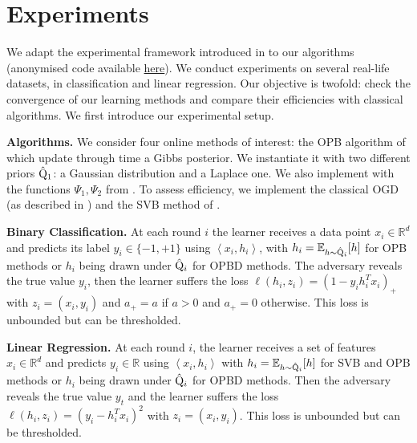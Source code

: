 \section{Experiments}
\label{sec: experiments}

We adapt the experimental framework introduced in \citet[Sec.5]{cherief2019generalization} to our algorithms (anonymised code available \href{https://anonymous.4open.science/r/Online-PAC-Bayes-learning-044F}{here}). We conduct experiments on several real-life datasets, in classification and
linear regression. Our objective is twofold: check the convergence of our learning methods and compare their efficiencies with classical algorithms. We first introduce our experimental setup.

\textbf{Algorithms.}
We consider four online methods of interest: the OPB algorithm of  which update through time a Gibbs posterior. We instantiate it with two different priors $\hat{\mathrm{Q}}_1$: a Gaussian distribution and a Laplace one. We also implement  with the functions $\Psi_1,\Psi_2$ from .
To assess efficiency, we implement the classical OGD (as described in \citealp[Alg. 1 of][]{zinkevich2003online}) and the SVB method of \citet{cherief2019generalization}.

\textbf{Binary Classification.} At each round $i$ the learner receives a data point $x_{i} \in \mathbb{R}^{d}$ and predicts its label $y_{i} \in\{-1,+1\}$ using $\left\langle x_{i}, h_{i}\right\rangle$, with $h_i= \mathbb{E}_{h\sim \hat{\mathrm{Q}}_i}[h]$ for OPB methods or $h_i$ being drawn under $\hat{\mathrm{Q}}_i$ for OPBD methods.
The adversary reveals the true value $y_{i}$, then the learner suffers the loss $\ell(h_i,z_i)=\left(1-y_{i} h_{i}^{T} x_{i}\right)_{+}$ with $z_i=(x_i,y_i)$ and $a_{+}=a$ if $a>0$ and $a_{+}=0$ otherwise. This loss is unbounded but can be thresholded.


\textbf{Linear Regression.} At each round $i$, the learner receives a set of features $x_{i} \in \mathbb{R}^{d}$ and predicts $y_{i} \in \mathbb{R}$ using $\left\langle x_{i}, h_{i}\right\rangle$ with $h_i= \mathbb{E}_{h\sim \hat{\mathrm{Q}}_i}[h]$ for SVB and OPB methods or $h_i$ being drawn under $\hat{\mathrm{Q}}_i$ for OPBD methods.
Then the adversary reveals the true value $y_{t}$ and the learner suffers the loss $\ell(h_i,z_i)=\left(y_{i}-h_{i}^{T} x_{i}\right)^{2}$ with $z_i=(x_i,y_i)$. This loss is unbounded but can be thresholded.


